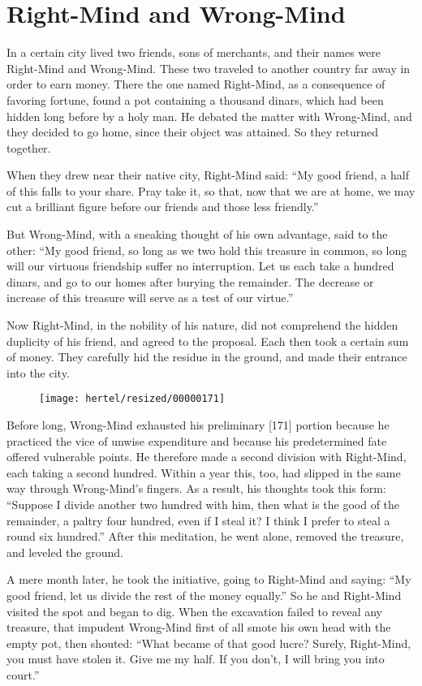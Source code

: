 \documentclass[article, twoside, 10pt]{memoir}
\begin{document}
\chapter{Right-Mind and Wrong-Mind}

In a certain city lived two friends, sons of merchants, and their
names were Right-Mind and Wrong-Mind. These two traveled to another
country far away in order to earn money. There the one named
Right-Mind, as a consequence of favoring fortune, found a pot
containing a thousand dinars, which had been hidden long before by
a holy man. He debated the matter with Wrong-Mind, and they decided
to go home, since their object was attained. So they returned
together.

When they drew near their native city, Right-Mind said:
``My good friend, a half of this falls to your share. Pray take it, so that, now that we are at home, we may cut a brilliant figure before our friends and those less friendly.''

But Wrong-Mind, with a sneaking thought of his own advantage, said
to the other:
``My good friend, so long as we two hold this treasure in common, so long will our virtuous friendship suffer no interruption. Let us each take a hundred dinars, and go to our homes after burying the remainder. The decrease or increase of this treasure will serve as a test of our virtue.''

Now Right-Mind, in the nobility of his nature, did not comprehend
the hidden duplicity of his friend, and agreed to the proposal.
Each then took a certain sum of money. They carefully hid the
residue in the ground, and made their entrance into the city.

\begin{figure}[p]\texttt{[image: hertel/resized/00000171]}\end{figure}Before long, Wrong-Mind exhausted his preliminary [171] portion
because he practiced the vice of unwise expenditure and because his
predetermined fate offered vulnerable points. He therefore made a
second division with Right-Mind, each taking a second hundred.
Within a year this, too, had slipped in the same way through
Wrong-Mind's fingers. As a result, his thoughts took this form:
``Suppose I divide another two hundred with him, then what is the good of the remainder, a paltry four hundred, even if I steal it? I think I prefer to steal a round six hundred.''
After this meditation, he went alone, removed the treasure, and
leveled the ground.

A mere month later, he took the initiative, going to Right-Mind and
saying:
``My good friend, let us divide the rest of the money equally.'' So
he and Right-Mind visited the spot and began to dig. When the
excavation failed to reveal any treasure, that impudent Wrong-Mind
first of all smote his own head with the empty pot, then shouted:
``What became of that good lucre? Surely, Right-Mind, you must have stolen it. Give me my half. If you don't, I will bring you into court.''
\end{document}
